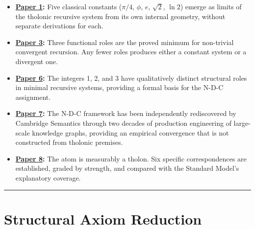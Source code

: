 \documentclass[12pt]{article}
\providecommand{\tightlist}{%
  \setlength{\itemsep}{0pt}\setlength{\parskip}{0pt}}
\begin{document}
\begin{itemize}
\tightlist
\item
  \textbf{\href{https://github.com/baardev/truevalue/blob/main/docnav/Research/papers/1_recursive-tholonic-five-constants/1_recursive-tholonic-five-constants.pdf}{Paper
  1}:} Five classical constants (\(\pi/4\), \(\phi\), \(e\),
  \(\sqrt{2}\), \(\ln 2\)) emerge as limits of the tholonic recursive
  system from its own internal geometry, without separate derivations
  for each.
\item
  \textbf{\href{https://github.com/baardev/truevalue/blob/main/docnav/Research/papers/3_minimal-recursive-triadic-framework/3_minimal-recursive-triadic-framework.pdf}{Paper
  3}:} Three functional roles are the proved minimum for non-trivial
  convergent recursion. Any fewer roles produces either a constant
  system or a divergent one.
\item
  \textbf{\href{https://github.com/baardev/truevalue/blob/main/docnav/Research/papers/6_qualitative-nature-integers-triadic-roles/6_qualitative-nature-integers-triadic-roles.pdf}{Paper
  6}:} The integers 1, 2, and 3 have qualitatively distinct structural
  roles in minimal recursive systems, providing a formal basis for the
  N-D-C assignment.
\item
  \textbf{\href{https://github.com/baardev/truevalue/blob/main/docnav/Research/papers/7_cambridge-semantics-tholonic-framework/7_cambridge-semantics-tholonic-framework.pdf}{Paper
  7}:} The N-D-C framework has been independently rediscovered by
  Cambridge Semantics through two decades of production engineering of
  large-scale knowledge graphs, providing an empirical convergence that
  is not constructed from tholonic premises.
\item
  \textbf{\href{https://github.com/baardev/truevalue/blob/main/docnav/Research/papers/8_atom-as-tholon-measurable-phenomena/8_atom-as-tholon-measurable-phenomena.pdf}{Paper
  8}:} The atom is measurably a tholon. Six specific correspondences are
  established, graded by strength, and compared with the Standard
  Model's explanatory coverage.
\end{itemize}

\begin{center}\rule{0.5\linewidth}{0.5pt}\end{center}

\section{Structural Axiom Reduction}\label{structural-axiom-reduction}
\end{document}
